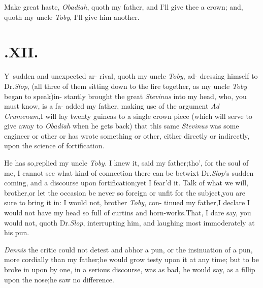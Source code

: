 \documentclass{article}
\begin{document}
\tsh Make great haste, \textit{Obadiah}, quoth my father,
and I’ll give thee a crown;\tsk\break
and, quoth my uncle \textit{Toby}, I’ll give him another.

\bigskip

\section{.\enspace  XII.}

\lettrine{Y}{\,} sudden and unexpected ar-\break
rival, quoth my uncle \textit{Toby}, ad-\break
dressing himself to Dr.\@ \textit{Slop},
(all three of them sitting down to the fire together, as my uncle
\textit{Toby} began to speak)\tsk in-\break
stantly brought the great \textit{Stevinus} into\break
my head, who, you must know, is a fa-
added my father, making use of the ar\-gument \textit{Ad
Crumenam},\tsh I will lay\break
twenty guineas to a single crown piece (which will serve to
give away to \textit{Obadiah} when he gets back) that this
same \textit{Stevinus} was some engineer or other\tsk\break
or has wrote something or other, either directly or indirectly,
upon the science of\break
fortification.

He has so,\tsk replied my uncle \textit{Toby.}\tsk\break
I knew it, said my father;\tsk tho’, for the soul of me, I cannot see what kind
of connection there can be betwixt Dr.\@ \textit{Slop}’s sudden
coming, and a discourse upon fortification;\tsk yet I
fear’d it.\tsk\break
Talk of what we will, brother,\tsk or let the occasion be
never so foreign or unfit for the subject,\tsk you are sure
to bring it in: I would not, brother \textit{Toby}, con-
tinued my father,\tsh I declare I would not have my head
so full of curtins and horn-works.\tsh That, I dare say, you
would not, quoth Dr.\@ \textit{Slop}, interrupting him, and
laughing most immoderately at\break
his pun.

\textit{Dennis} the critic could not detest and abhor a pun, or
the insinuation of a pun, more cordially than my father;\tsh he
would grow testy upon it at any time;\tsk\break
but to be broke in upon by one, in a serious discourse, was
as bad, he would say, as a fillip upon the nose;\tsh he saw\break
no difference.
\end{document}
